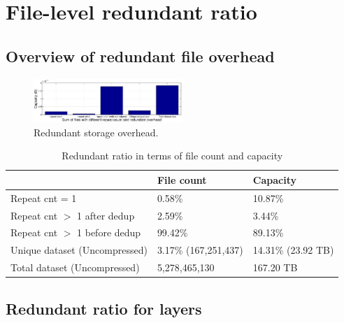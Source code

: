 \section{File-level redundant ratio}
\label{sec:dedup}

\subsection{Overview of redundant file overhead}

\begin{figure}
	\centering
	\includegraphics[width=0.5\textwidth]{graphs/capacity_data_ratio.eps}
	\caption{Redundant storage overhead.
	}
	\label{fig_redundant_overhead}
\end{figure}

\begin{table} 
	\centering 
	\scriptsize  
	\caption{Redundant ratio in terms of file count and capacity} \label{tbl:redundant_ratio} 
	\begin{tabular}{|l|l|l|}%
		\hline 
		       & File count & Capacity \\
		\hline
		Repeat cnt = 1 & 0.58\% & 10.87\%\\
		\hline
		Repeat cnt $>$ 1 after dedup & 2.59\% & 3.44\%\\
		\hline
		Repeat cnt $>$ 1 before dedup  & 99.42\%  & 89.13\%\\
		\hline
		Unique dataset (Uncompressed) & 3.17\% (167,251,437)  &  14.31\% (23.92 TB) \\
		\hline 
		Total dataset (Uncompressed) & 5,278,465,130 & 167.20 TB \\
		\hline 	
	\end{tabular} 
\end{table} 

\subsection{Redundant ratio for layers}

